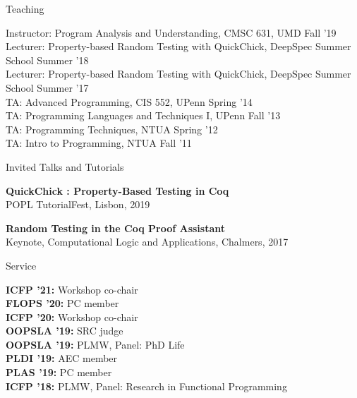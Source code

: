 \documentclass{resume} %
\begin{document}

\newcommand{\teach}[3]{
  {#1: #2} \hfill #3 \\
  }

\begin{rSection}{Teaching}

  \teach{Instructor}{Program Analysis and Understanding, CMSC 631, UMD}{Fall '19}
  \teach{Lecturer}{Property-based Random Testing with QuickChick, DeepSpec Summer School}{Summer '18}
  \teach{Lecturer}{Property-based Random Testing with QuickChick, DeepSpec Summer School}{Summer '17}  
  \teach{TA}{Advanced Programming, CIS 552, UPenn}{Spring '14}
  \teach{TA}{Programming Languages and Techniques I, UPenn}{Fall '13}
  \teach{TA}{Programming Techniques, NTUA}{Spring '12}
  \teach{TA}{Intro to Programming, NTUA}{Fall '11}
\end{rSection}



\newcommand{\talk}[3]{
  {\bf #1} \\ %
  {#3}
  }


\begin{rSection}{Invited Talks and Tutorials}

\talk{QuickChick : Property-Based Testing in Coq}
    {QuickChickTutorial.pdf}
    {POPL TutorialFest, Lisbon, 2019}

\talk{Random Testing in the Coq Proof Assistant}
     {InvitedCLA.pdf}
     {Keynote, Computational Logic and Applications, Chalmers, 2017}

\end{rSection}


\newcommand{\serve}[2]{
  {\bf #1:} #2 \\
  }


\begin{rSection}{Service}

  \serve{ICFP '21}{Workshop co-chair}
  \serve{FLOPS '20}{PC member}
  \serve{ICFP '20}{Workshop co-chair}
  \serve{OOPSLA '19}{SRC judge}
  \serve{OOPSLA '19}{PLMW, Panel: PhD Life}
  \serve{PLDI '19}{AEC member}
  \serve{PLAS '19}{PC member}
  \serve{ICFP '18}{PLMW, Panel: Research in Functional Programming}
  
\end{rSection}
\end{document}
